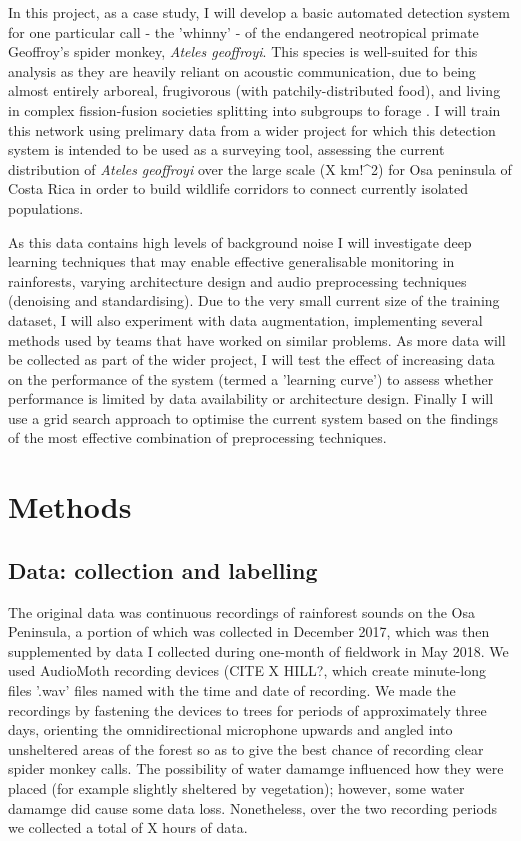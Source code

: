 \documentclass[11pt]{article}
\begin{document}
In this project, as a case study, I will develop a basic automated detection system for one particular call - the 'whinny' - of the endangered neotropical primate Geoffroy’s spider monkey, \textit{Ateles geoffroyi}. This species is well-suited for this analysis as they are heavily reliant on acoustic communication, due to being almost entirely arboreal, frugivorous (with patchily-distributed food), and living in complex fission-fusion societies splitting into subgroups to forage \citep{ramos2008communication}. I will train this network using prelimary data from a wider project for which this detection system is intended to be used as a surveying tool, assessing the current distribution of \textit{Ateles geoffroyi} over the large scale (X km!^2) for Osa peninsula of Costa Rica in order to build wildlife corridors to connect currently isolated populations. 

As this data contains high levels of background noise I will investigate deep learning techniques that may enable effective generalisable monitoring in rainforests, varying architecture design and audio preprocessing techniques (denoising and standardising). Due to the very small current size of the training dataset, I will also experiment with data augmentation, implementing several methods used by teams that have worked on similar problems. As more data will be collected as part of the wider project, I will test the effect of increasing data on the performance of the system (termed a 'learning curve') to assess whether performance is limited by data availability or architecture design. Finally I will use a grid search approach to optimise the current system based on the findings of the most effective combination of preprocessing techniques. 

	
\section{Methods} 
\subsection{Data: collection and labelling}

The original data was continuous recordings of rainforest sounds on the Osa Peninsula, a portion of which was collected in December 2017, which was then supplemented by data I collected during one-month of fieldwork in May 2018. We used AudioMoth recording devices (CITE X HILL?, which create minute-long files '.wav' files named with the time and date of recording. We made the recordings by fastening the devices to trees for periods of approximately three days, orienting the omnidirectional microphone upwards and angled into unsheltered areas of the forest so as to give the best chance of recording clear spider monkey calls. The possibility of water damamge influenced how they were placed (for example slightly sheltered by vegetation); however, some water damamge did cause some data loss. Nonetheless, over the two recording periods we collected a total of X hours of data.
\end{document}
